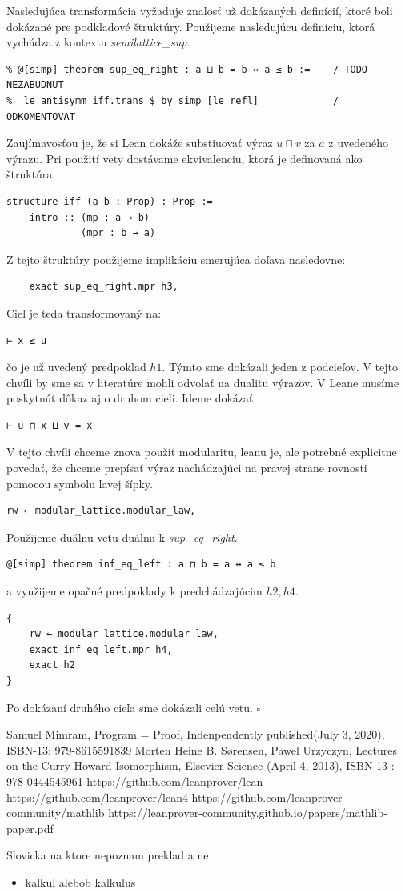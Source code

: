 \documentclass[a4paper,10pt,oneside]{report}%
\begin{document}
    Nasledujúca transformácia vyžaduje znalosť už dokázaných definícií, ktoré
boli dokázané pre podkladové štruktúry. Použijeme nasledujúcu definíciu, ktorá vychádza
z kontextu \emph{semilattice\_sup}.
\begin{lstlisting}
% @[simp] theorem sup_eq_right : a ⊔ b = b ↔ a ≤ b :=    / TODO NEZABUDNUT
%  le_antisymm_iff.trans $ by simp [le_refl]             / ODKOMENTOVAT
    \end{lstlisting}
    Zaujímavosťou je, že si Lean dokáže substiuovať výraz $u \sqcap v$ za $a$ z uvedeného
výrazu. Pri použití vety dostávame ekvivalenciu, ktorá je definovaná ako štruktúra.
\begin{lstlisting}
structure iff (a b : Prop) : Prop :=
    intro :: (mp : a → b)
             (mpr : b → a)
\end{lstlisting}
Z tejto štruktúry použijeme implikáciu smerujúca doľava nasledovne:
\begin{lstlisting}
    exact sup_eq_right.mpr h3,
\end{lstlisting}
    Cieľ je teda transformovaný na:
\begin{lstlisting}
⊢ x ≤ u
\end{lstlisting}
čo je už uvedený predpoklad $h1$. Týmto sme dokázali jeden z podcieľov.
    V tejto chvíli by sme sa v literatúre mohli odvolať na dualitu výrazov.
    V Leane musíme poskytnúť dôkaz aj o druhom cieli. Ideme dokázať
\begin{lstlisting}
⊢ u ⊓ x ⊔ v = x
\end{lstlisting}
V tejto chvíli chceme znova použiť modularitu, leanu je, ale potrebné explicitne povedať,
    že chceme prepísať výraz nachádzajúci na pravej strane rovnosti pomocou symbolu
ľavej šípky.
\begin{lstlisting}
rw ← modular_lattice.modular_law,
\end{lstlisting}
    Použijeme duálnu vetu
    duálnu k \emph{sup\_eq\_right}.
\begin{lstlisting}
@[simp] theorem inf_eq_left : a ⊓ b = a ↔ a ≤ b
\end{lstlisting}
    a využijeme opačné predpoklady k predchádzajúcim $h2, h4$.
\begin{lstlisting}
{
    rw ← modular_lattice.modular_law,
    exact inf_eq_left.mpr h4,
    exact h2
}
\end{lstlisting}

Po dokázaní druhého cieľa sme dokázali celú vetu. $\square$

\begin{thebibliography}{xx}
     Samuel Mimram, Program = Proof, Indenpendently published(July 3, 2020), ISBN-13: 979-8615591839
     Morten Heine B. Sørensen, Pawel Urzyczyn, Lectures on the Curry-Howard Isomorphism,
        Elsevier Science (April 4, 2013),  ISBN-13 : 978-0444545961
     https://github.com/leanprover/lean
     https://github.com/leanprover/lean4
     https://github.com/leanprover-community/mathlib
     https://leanprover-community.github.io/papers/mathlib-paper.pdf
\end{thebibliography}

Slovicka na ktore nepoznam preklad a ne
\begin{itemize}
    \item kalkul alebob kalkulus
\end{itemize}
\end{document}
